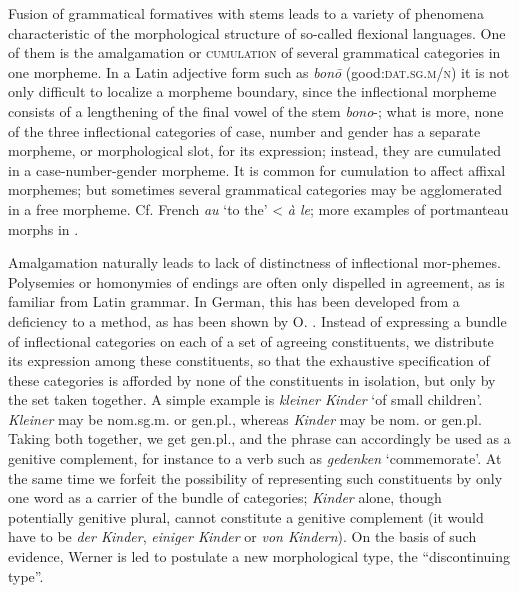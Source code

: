 Fusion of grammatical formatives with stems leads to a variety of phenomena characteristic of the morphological structure of so-called flexional languages. One of them is the amalgamation or \textsc{cumulation} of several grammatical categories in one morpheme. In a Latin adjective form such as \textit{bon\=o} (good:\textsc{dat.sg.m/n}) it is not only difficult to localize a morpheme boundary, since the inflectional morpheme consists of a lengthening of the final vowel of the stem \textit{bono}{}-; what is more, none of the three inflectional categories of case, number and gender has a separate morpheme, or morphological slot, for its expression; instead, they are cumulated in a case-number-gender morpheme. It is common for cumulation to affect affixal morphemes; but sometimes several grammatical categories may be agglomerated in a free morpheme. Cf. French \textit{au} ‘to the’ {\textless} \textit{à le}; more examples of portmanteau morphs in \citet[§6]{JeffersEtAl1980}.

Amalgamation naturally leads to lack of distinctness of inflectional mor-\linebreak phemes. Polysemies or homonymies of endings are often only dispelled in agreement, as is familiar from Latin grammar. In German, this has been developed from a deficiency to a method, as has been shown by O. \citet{Werner1979}. Instead of expressing a bundle of inflectional categories on each of a set of agreeing constituents, we distribute its expression among these constituents, so that the exhaustive specification of these categories is afforded by none of the constituents in isolation, but only by the set taken together. A simple example is \textit{kleiner Kinder} ‘of small children’. \textit{Kleiner} may be nom.sg.m. or gen.pl., whereas \textit{Kinder} may be nom. or gen.pl. Taking both together, we get gen.pl., and the phrase can accordingly be used as a genitive complement, for instance to a verb such as \textit{gedenken} ‘commemorate’. At the same time we forfeit the possibility of representing such constituents by only one word as a carrier of the bundle of categories; \textit{Kinder} alone, though potentially genitive plural, cannot constitute a genitive complement (it would have to be \textit{der Kinder}, \textit{einiger Kinder} or \textit{von Kindern}). On the basis of such evidence, Werner is led to postulate a new morphological type, the ``discontinuing type''.

